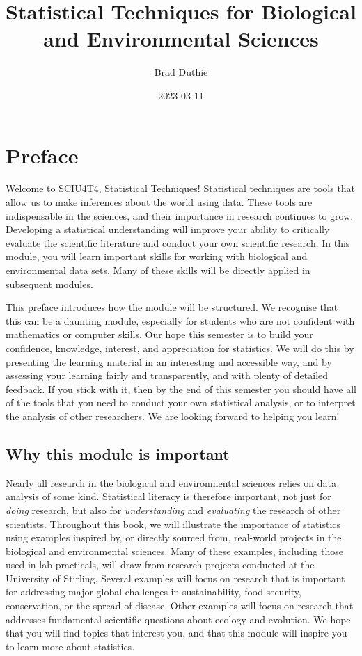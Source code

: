 \documentclass[
]{scrbook}
\title{Statistical Techniques for Biological and Environmental Sciences}
\author{Brad Duthie}
\date{2023-03-11}
\begin{document}
\maketitle

{
\hypersetup{linkcolor=}
\setcounter{tocdepth}{1}
\tableofcontents
}
\hypertarget{preface}{%
\chapter*{Preface}\label{preface}}

Welcome to SCIU4T4, Statistical Techniques!
Statistical techniques are tools that allow us to make inferences about the world using data.
These tools are indispensable in the sciences, and their importance in research continues to grow.
Developing a statistical understanding will improve your ability to critically evaluate the scientific literature and conduct your own scientific research.
In this module, you will learn important skills for working with biological and environmental data sets.
Many of these skills will be directly applied in subsequent modules.

This preface introduces how the module will be structured.
We recognise that this can be a daunting module, especially for students who are not confident with mathematics or computer skills.
Our hope this semester is to build your confidence, knowledge, interest, and appreciation for statistics.
We will do this by presenting the learning material in an interesting and accessible way, and by assessing your learning fairly and transparently, and with plenty of detailed feedback.
If you stick with it, then by the end of this semester you should have all of the tools that you need to conduct your own statistical analysis, or to interpret the analysis of other researchers.
We are looking forward to helping you learn!

\hypertarget{why-this-module-is-important}{%
\section*{Why this module is important}\label{why-this-module-is-important}}

Nearly all research in the biological and environmental sciences relies on data analysis of some kind.
Statistical literacy is therefore important, not just for \emph{doing} research, but also for \emph{understanding} and \emph{evaluating} the research of other scientists.
Throughout this book, we will illustrate the importance of statistics using examples inspired by, or directly sourced from, real-world projects in the biological and environmental sciences.
Many of these examples, including those used in lab practicals, will draw from research projects conducted at the University of Stirling.
Several examples will focus on research that is important for addressing major global challenges in sustainability, food security, conservation, or the spread of disease.
Other examples will focus on research that addresses fundamental scientific questions about ecology and evolution.
We hope that you will find topics that interest you, and that this module will inspire you to learn more about statistics.
\end{document}

